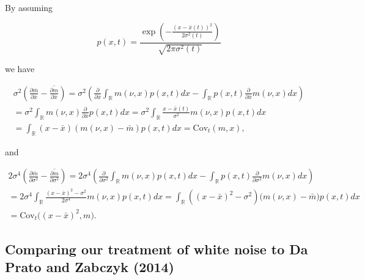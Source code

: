 \documentclass[]{article}
\begin{document}
By assuming

\begin{equation}
p(x,t)=\frac{\exp\left(-\frac{(x-\bar x(t))^2}{2\sigma^2(t)}\right)}{\sqrt{2\pi\sigma^2(t)}}
\end{equation}

we have

\begin{multline}
\sigma^2\left(\frac{\partial\bar m}{\partial\bar x}-\overline{\frac{\partial m}{\partial\bar x}}\right)=\sigma^2\left(\frac{\partial}{\partial\bar x}\int_\mathbb{R}m(\nu,x)p(x,t)dx-\int_\mathbb{R}p(x,t)\frac{\partial}{\partial \bar x}m(\nu,x)dx\right)\\=\sigma^2\int_\mathbb{R}m(\nu,x)\frac{\partial}{\partial\bar x}p(x,t)dx=\sigma^2\int_\mathbb{R}\frac{x-\bar x(t)}{\sigma^2}m(\nu,x)p(x,t)dx\\=\int_\mathbb{R}(x-\bar x)(m(\nu,x)-\bar m)p(x,t)dx=\mathrm{Cov}_t(m,x),
\end{multline}

and

\begin{multline}
2\sigma^4\left(\frac{\partial\bar m}{\partial\sigma^2}-\overline{\frac{\partial m}{\partial\sigma^2}}\right)=2\sigma^4\left(\frac{\partial}{\partial\sigma^2}\int_\mathbb{R}m(\nu,x)p(x,t)dx-\int_\mathbb{R}p(x,t)\frac{\partial}{\partial\sigma^2}m(\nu,x)dx\right)\\=2\sigma^4\int_\mathbb{R}\frac{(x-\bar x)^2-\sigma^2}{2\sigma^4}m(\nu,x)p(x,t)dx=\int_\mathbb{R}\left((x-\bar x)^2-\sigma^2\right)\big(m(\nu,x)-\bar m\big)p(x,t)dx\\=\mathrm{Cov}_t\Big((x-\bar x)^2,m\Big).
\end{multline}

\hypertarget{comparing-our-treatment-of-white-noise-to-da-prato-and-zabczyk-2014}{%
\subsection{\texorpdfstring{Comparing our treatment of white noise to Da
Prato and Zabczyk (2014)
\label{DPZ14}}{Comparing our treatment of white noise to Da Prato and Zabczyk (2014) }}\label{comparing-our-treatment-of-white-noise-to-da-prato-and-zabczyk-2014}}
\end{document}
